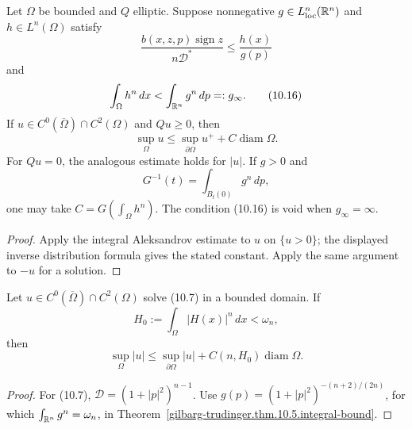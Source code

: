 \begin{theorem}
\label{gilbarg-trudinger.thm.10.5.integral-bound}
Let $\Omega$ be bounded and $Q$ elliptic.  Suppose nonnegative
$g\in L^n_{\mathrm{loc}}(\mathbb{R}^n)$ and $h\in L^n(\Omega)$ satisfy
\begin{equation}
\frac{b(x,z,p)\operatorname{sign}z}{n\mathscr D^*}
\le\frac{h(x)}{g(p)}
\tag{10.15}
\end{equation}
and
\begin{equation}
\int_\Omega h^n\,dx<\int_{\mathbb{R}^n}g^n\,dp=:g_\infty.
\tag{10.16}
\end{equation}
If $u\in C^0(\overline\Omega)\cap C^2(\Omega)$ and $Qu\ge0$, then
\begin{equation}
\sup_\Omega u\le\sup_{\partial\Omega}u^++C\operatorname{diam}\Omega.
\tag{10.17}
\end{equation}
For $Qu=0$, the analogous estimate holds for $|u|$.  If $g>0$ and
\[
G^{-1}(t)=\int_{B_t(0)}g^n\,dp,
\]
one may take $C=G(\int_\Omega h^n)$.  The condition \textup{(10.16)} is
void when $g_\infty=\infty$.
\end{theorem}
\begin{proof}
\sketch Apply the integral Aleksandrov estimate to $u$ on $\{u>0\}$;
the displayed inverse distribution formula gives the stated constant.  Apply
the same argument to $-u$ for a solution.
\end{proof}

\begin{corollary}
\label{gilbarg-trudinger.cor.10.6.prescribed-mean-curvature-bound}
Let $u\in C^0(\overline\Omega)\cap C^2(\Omega)$ solve
\textup{(10.7)} in a bounded domain.  If
\begin{equation}
H_0:=\int_\Omega|H(x)|^n\,dx<\omega_n,
\tag{10.18}
\end{equation}
then
\begin{equation}
\sup_\Omega|u|\le\sup_{\partial\Omega}|u|
+C(n,H_0)\operatorname{diam}\Omega.
\tag{10.19}
\end{equation}
\end{corollary}
\begin{proof}
\sketch For \textup{(10.7)},
$\mathscr D=(1+|p|^2)^{n-1}$.  Use
$g(p)=(1+|p|^2)^{-(n+2)/(2n)}$, for which
$\int_{\mathbb{R}^n}g^n=\omega_n$, in Theorem~\ref{gilbarg-trudinger.thm.10.5.integral-bound}.
\end{proof}


